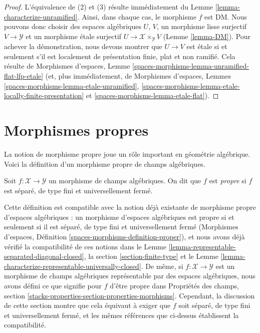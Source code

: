 \begin{proof}
L'\'equivalence de (2) et (3) r\'esulte imm\'ediatement du
Lemme \ref{lemma-characterize-unramified}. Ainsi, dans chaque cas,
le morphisme $f$ est DM.
Nous pouvons donc choisir des espaces alg\'ebriques $U$, $V$,
un morphisme lisse surjectif
$V \to \mathcal{Y}$ et un morphisme \'etale surjectif
$U \to \mathcal{X} \times_\mathcal{Y} V$ (Lemme \ref{lemma-DM}).
Pour achever la d\'emonstration, nous devons montrer que
$U \to V$ est \'etale si et seulement s'il est localement de pr\'esentation
finie, plat et non ramifi\'e.
Cela r\'esulte de Morphismes d'espaces, Lemme
\ref{spaces-morphisms-lemma-unramified-flat-lfp-etale}
(et, plus imm\'ediatement, de Morphismes d'espaces, Lemmes
\ref{spaces-morphisms-lemma-etale-unramified},
\ref{spaces-morphisms-lemma-etale-locally-finite-presentation} et
\ref{spaces-morphisms-lemma-etale-flat}).
\end{proof}






\section{Morphismes propres}
\label{section-proper}

\noindent
La notion de morphisme propre joue un rôle important en géométrie algébrique.
Voici la définition d'un morphisme propre de champs algébriques.

\begin{definition}
\label{definition-proper}
Soit $f : \mathcal{X} \to \mathcal{Y}$
un morphisme de champs algébriques.
On dit que $f$ est {\it propre} si $f$ est séparé, de type fini et
universellement fermé.
\end{definition}

\noindent
Cette définition est compatible avec la notion déjà existante de morphisme propre
d'espaces algébriques : un morphisme d'espaces algébriques est propre si et seulement si
il est séparé, de type fini et universellement fermé
(Morphismes d'espaces, Définition \ref{spaces-morphisms-definition-proper}),
et nous avons déjà vérifié la compatibilité de ces notions dans le
Lemme \ref{lemma-representable-separated-diagonal-closed},
la section \ref{section-finite-type} et le
Lemme \ref{lemma-characterize-representable-universally-closed}.
De même, si $f : \mathcal{X} \to \mathcal{Y}$ est un
morphisme de champs algébriques représentable par des espaces algébriques,
nous avons défini ce que signifie pour $f$ d'être propre dans
Propriétés des champs, section
\ref{stacks-properties-section-properties-morphisms}.
Cependant, la discussion de cette section montre que cela
équivaut à exiger que $f$ soit séparé, de type fini et
universellement fermé, et les mêmes références que ci-dessus établissent la
compatibilité.

